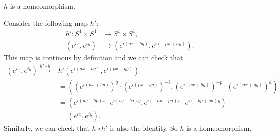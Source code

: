 \documentclass[a4paper, 12pt]{article}
\begin{document}
\begin{solution}
\begin{claim}
\(h\) is a homeomorphism.
\end{claim}
\begin{claimproof}
Consider the following map \(h'\):
\begin{align*}
    h':S^1\times S^1&\rightarrow S^1\times S^1,\\ 
    (e^{ix},e^{iy})&\mapsto (e^{i(qx-by)},e^{i(-px+ay)}).
\end{align*}
This map is continous by definition and we can check that 
\begin{align*}
    (e^{ix},e^{iy})\xrightarrow{h'\circ h}&h'(e^{i(ax+by)},e^{i(px+qy)})\\ 
                                          &=((e^{i(ax+by)})^q\cdot (e^{i(px+qy)})^{-b},(e^{i(ax+by)})^{-p}\cdot (e^{i(px+qy)})^a)\\ 
                                          &=(e^{i(aq-bp)x}\cdot e^{i(bq-bq)y}, e^{i(-ap+pa)x}\cdot e^{i(-bp+qa)y})\\ 
                                          &=(e^{ix},e^{iy}).
\end{align*}
Similarly, we can check that \(h\circ h'\) is also the identity. So \(h\) is a homeomorphism.
\end{claimproof}


\end{solution}
\end{document}
